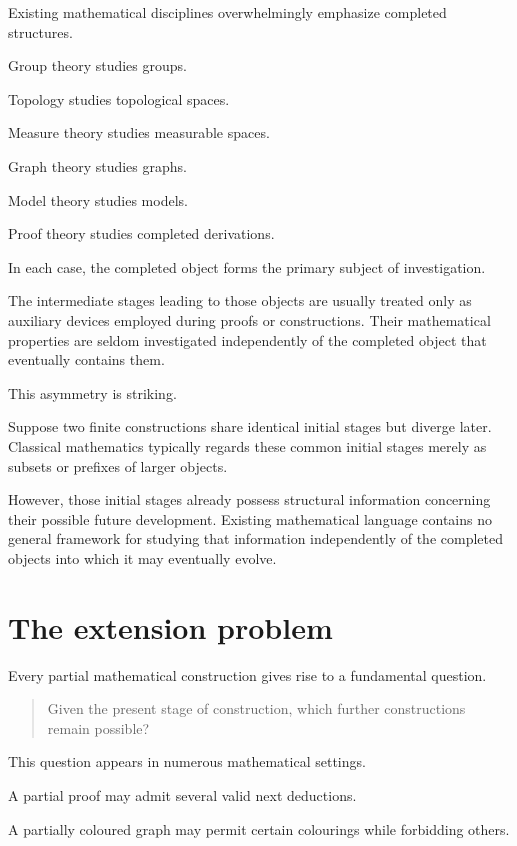 \documentclass[13pt,openany]{book}
\theoremstyle{plain}
\theoremstyle{definition}
\begin{document}
Existing mathematical disciplines overwhelmingly emphasize completed
structures.

Group theory studies groups.

Topology studies topological spaces.

Measure theory studies measurable spaces.

Graph theory studies graphs.

Model theory studies models.

Proof theory studies completed derivations.

In each case, the completed object forms the primary subject of investigation.

The intermediate stages leading to those objects are usually treated only as
auxiliary devices employed during proofs or constructions. Their mathematical
properties are seldom investigated independently of the completed object that
eventually contains them.

This asymmetry is striking.

Suppose two finite constructions share identical initial stages but diverge later.
Classical mathematics typically regards these common initial stages merely as
subsets or prefixes of larger objects.

However, those initial stages already possess structural information concerning
their possible future development. Existing mathematical language contains no
general framework for studying that information independently of the completed
objects into which it may eventually evolve.


\section{The extension problem}

Every partial mathematical construction gives rise to a fundamental question.

\begin{quote}
Given the present stage of construction, which further constructions remain
possible?
\end{quote}

This question appears in numerous mathematical settings.

A partial proof may admit several valid next deductions.

A partially coloured graph may permit certain colourings while forbidding
others.
\end{document}
